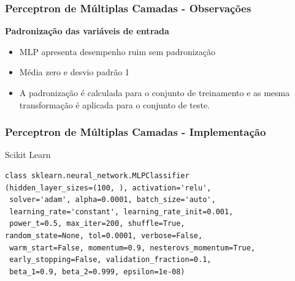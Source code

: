 \documentclass{beamer}
\begin{document}
\begin{frame}
\frametitle{Perceptron de Múltiplas Camadas - Observações}
\textbf{Padronização das variáveis de entrada}
\begin{itemize}
\item MLP apresenta desempenho ruim sem padronização
\item Média zero e desvio padrão 1
\item A padronização é calculada para o conjunto de treinamento e as mesma transformação é aplicada para o conjunto de teste.
\end{itemize}
\end{frame}

\begin{frame}[fragile] %
\frametitle{Perceptron de Múltiplas Camadas - Implementação}
\begin{block}{Scikit Learn}
\begin{verbatim}
class sklearn.neural_network.MLPClassifier
(hidden_layer_sizes=(100, ), activation='relu',
 solver='adam', alpha=0.0001, batch_size='auto',
 learning_rate='constant', learning_rate_init=0.001,
 power_t=0.5, max_iter=200, shuffle=True, 
random_state=None, tol=0.0001, verbose=False,
 warm_start=False, momentum=0.9, nesterovs_momentum=True,
 early_stopping=False, validation_fraction=0.1,
 beta_1=0.9, beta_2=0.999, epsilon=1e-08)
\end{verbatim}
\end{block}

\end{frame}
\end{document}
